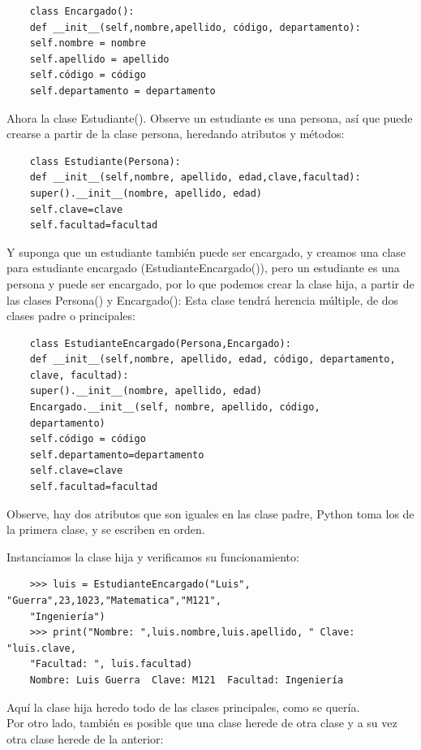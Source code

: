 {\begin{lstlisting}
	class Encargado():
	def __init__(self,nombre,apellido, código, departamento):
	self.nombre = nombre
	self.apellido = apellido
	self.código = código
	self.departamento = departamento
\end{lstlisting}


Ahora la clase {\ttfamily Estudiante()}. Observe un estudiante es una persona, así que puede crearse a partir de la clase persona, heredando atributos y métodos:  

\begin{lstlisting}
	class Estudiante(Persona):
	def __init__(self,nombre, apellido, edad,clave,facultad):
	super().__init__(nombre, apellido, edad)
	self.clave=clave
	self.facultad=facultad
\end{lstlisting}

Y suponga que un estudiante también puede ser encargado, y creamos una clase para estudiante encargado ({\ttfamily EstudianteEncargado()}), pero un estudiante es una persona y puede ser encargado, por lo que podemos crear la clase hija, a partir de las clases {\ttfamily Persona()} y {\ttfamily Encargado()}:
Esta clase tendrá herencia múltiple, de dos clases padre o principales:

\begin{lstlisting}
	class EstudianteEncargado(Persona,Encargado):
	def __init__(self,nombre, apellido, edad, código, departamento,
	clave, facultad):
	super().__init__(nombre, apellido, edad)
	Encargado.__init__(self, nombre, apellido, código,
	departamento)        
	self.código = código
	self.departamento=departamento
	self.clave=clave
	self.facultad=facultad
\end{lstlisting}

Observe, hay dos atributos que son iguales en las clase padre, Python toma los de la primera clase, y se escriben en orden.

Instanciamos la clase hija y verificamos su funcionamiento:
\begin{lstlisting}
	>>> luis = EstudianteEncargado("Luis", "Guerra",23,1023,"Matematica","M121",
	"Ingeniería")
	>>> print("Nombre: ",luis.nombre,luis.apellido, " Clave: "luis.clave,
	"Facultad: ", luis.facultad)
	Nombre: Luis Guerra  Clave: M121  Facultad: Ingeniería
\end{lstlisting}

Aquí la clase hija heredo todo de las clases principales, como se quería.\\

Por otro lado, también es posible  que una clase herede de otra clase y a su vez otra clase herede de la anterior:

}
